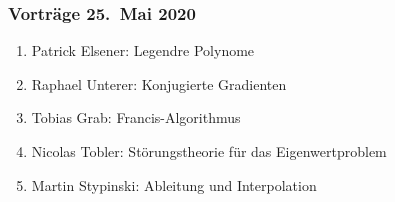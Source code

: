 %
%
%


\begin{frame}
\frametitle{Vorträge 25.~Mai 2020}
\begin{enumerate}
\item<2->
Patrick Elsener: Legendre Polynome
\bigskip

\item<4->
Raphael Unterer: Konjugierte Gradienten
\bigskip

\item<5->
Tobias Grab: Francis-Algorithmus
\bigskip

\item<6->
Nicolas Tobler: Störungstheorie für das Eigenwertproblem
\bigskip

\item<7->
Martin Stypinski: Ableitung und Interpolation

\end{enumerate}
\end{frame}


